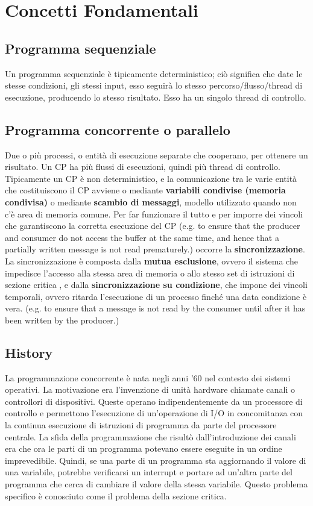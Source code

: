 \documentclass[10pt,a4paper]{article}
\begin{document}
\tableofcontents
\newpage
\section{Concetti Fondamentali}
\subsection{Programma sequenziale}
Un programma sequenziale è tipicamente deterministico; ciò significa che date le stesse condizioni, gli stessi input, esso seguirà lo stesso percorso/flusso/thread di esecuzione, producendo lo stesso risultato. Esso ha un singolo thread di controllo.

\subsection{Programma concorrente o parallelo}
Due o più processi, o entità di esecuzione separate che cooperano, per ottenere un risultato.
Un CP ha più flussi di esecuzioni, quindi più thread di controllo.
Tipicamente un CP è non deterministico, e la comunicazione tra le varie entità che costituiscono il CP avviene o mediante \textbf{variabili condivise (memoria condivisa)} o mediante \textbf{scambio di messaggi}, modello utilizzato quando non c'è area di memoria comune.
Per far funzionare il tutto e per imporre dei vincoli che garantiscono la corretta esecuzione del CP (e.g. to ensure that the producer and consumer do not access the buffer at the same time, and hence that a partially written message is not read prematurely.) occorre la \textbf{sincronizzazione}.
La sincronizzazione è composta dalla \textbf{mutua esclusione}, ovvero il sistema che impedisce l'accesso alla stessa area di memoria o allo stesso set di istruzioni di sezione critica , e dalla \textbf{sincronizzazione su condizione}, che impone dei vincoli temporali, ovvero ritarda l'esecuzione di un processo finché una data condizione è vera.
(e.g. to ensure that a message is not read by the consumer until after it has been written by the producer.)

\subsection{History}
La programmazione concorrente è nata negli anni '60 nel contesto dei sistemi operativi. La motivazione era l'invenzione di unità hardware chiamate canali o controllori di dispositivi. Queste operano indipendentemente da un processore di controllo e permettono l'esecuzione di un'operazione di I/O in concomitanza con la continua esecuzione di istruzioni di programma da parte del processore centrale.
La sfida della programmazione che risultò dall'introduzione dei canali era che ora le parti di un programma potevano essere eseguite in un ordine imprevedibile. Quindi, se una parte di un programma sta aggiornando il valore di una variabile, potrebbe verificarsi un interrupt e portare ad un'altra parte del programma che cerca di cambiare il valore della stessa variabile. Questo problema specifico è conosciuto come il problema della sezione critica.
\end{document}
